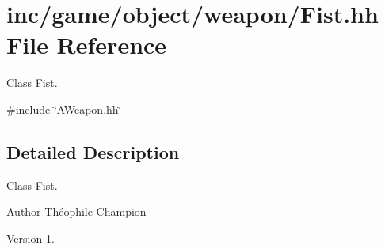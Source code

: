 \hypertarget{Fist_8hh}{}\section{inc/game/object/weapon/\+Fist.hh File Reference}
\label{Fist_8hh}


Class Fist.  


{\ttfamily \#include \char`\"{}A\+Weapon.\+hh\char`\"{}}\newline


\subsection{Detailed Description}
Class Fist. 

\begin{DoxyAuthor}{Author}
Théophile Champion 
\end{DoxyAuthor}
\begin{DoxyVersion}{Version}
1. 
\end{DoxyVersion}
